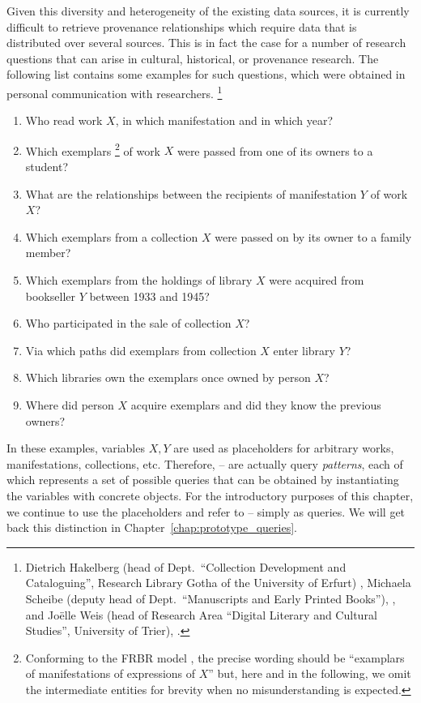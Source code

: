Given this diversity and heterogeneity of the existing data sources,
it is currently difficult to retrieve provenance relationships
which require data that is distributed over several sources.
This is in fact the case for a number of research questions
that can arise in cultural, historical, or provenance research.
The following list contains some examples for such questions,
which were obtained in personal communication with researchers.%
\footnote{%
  Dietrich Hakelberg 
  (head of Dept.\ \enquote{Collection Development and Cataloguing}, Research Library Gotha of the University of Erfurt)
  \autocite{HakelbergWeb},
  Michaela Scheibe
  (deputy head of Dept.\ \enquote{Manuscripts and Early Printed Books}),
  \autocite{ScheibeWeb},
  and Jo\"elle Weis 
  (head of Research Area \enquote{Digital Literary and Cultural Studies}, University of Trier), 
  \autocite{WeisWeb}.
}
%
\begin{enumerate}
  \item[\exaquery{1}]
    Who read %
    work $X$, in which manifestation and in which year?
  \item[\exaquery{2}]
    Which exemplars%
    \footnote{%
      Conforming to the FRBR model \autocite{FRBR1998},
      the precise wording should be \enquote{examplars of manifestations of expressions of $X$}
      but, here and in the following,
      we omit the intermediate entities for brevity when no misunderstanding is expected.%
    }
    of work $X$
    were passed from one of its owners to a student?
  \item[\exaquery{3}]
    What are the relationships between the recipients of manifestation $Y$ of work $X$?
  \item[\exaquery{4}]
    Which exemplars from a collection $X$ were passed on by its owner to a family member?
  \item[\exaquery{5}]
    Which exemplars from the holdings of library $X$ were acquired from bookseller $Y$
    between 1933 and 1945?
  \item[\exaquery{6}]
    Who participated in the sale of collection $X$?
  \item[\exaquery{7}]
    Via which paths did exemplars from collection $X$ enter library $Y$?
  \item[\exaquery{8}]
    Which libraries own the exemplars once owned by person $X$?
  \item[\exaquery{9}]
    Where did person $X$ acquire exemplars and did they know the previous owners?
\end{enumerate}
%
In these examples, variables $X,Y$ are used as placeholders for arbitrary works,
manifestations, collections, etc. Therefore, -- are actually
query \emph{patterns}, each of which represents a set of possible queries
that can be obtained by instantiating the variables with concrete objects.
For the introductory purposes of this chapter,
we continue to use the placeholders and refer to --
simply as queries. We will get back this distinction in Chapter~\ref{chap:prototype_queries}.

